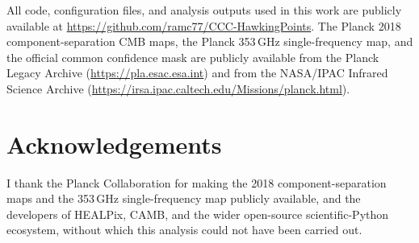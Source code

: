 \documentclass[11pt,a4paper]{article}
\begin{document}
All code, configuration files, and analysis outputs used in this work are publicly available at \url{https://github.com/ramc77/CCC-HawkingPoints}. The Planck 2018 component-separation CMB maps, the Planck 353\,GHz single-frequency map, and the official common confidence mask are publicly available from the Planck Legacy Archive (\url{https://pla.esac.esa.int}) and from the NASA/IPAC Infrared Science Archive (\url{https://irsa.ipac.caltech.edu/Missions/planck.html}).

\section*{Acknowledgements}

I thank the Planck Collaboration for making the 2018 component-separation maps and the 353\,GHz single-frequency map publicly available, and the developers of HEALPix, CAMB, and the wider open-source scientific-Python ecosystem, without which this analysis could not have been carried out.
\end{document}
